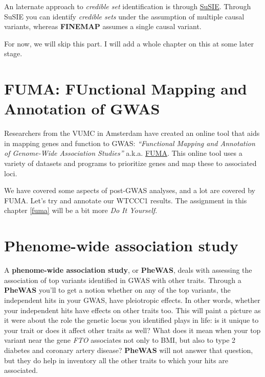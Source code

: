 \documentclass[
]{book}
\begin{document}
An laternate approach to \emph{credible set} identification is through \href{https://stephenslab.github.io/susieR/index.html}{SuSIE}. Through SuSIE you can identify \emph{credible sets} under the assumption of multiple causal variants, whereas \textbf{FINEMAP} assumes a single causal variant.

For now, we will skip this part. I will add a whole chapter on this at some later stage.

\hypertarget{fuma-functional-mapping-and-annotation-of-gwas}{%
\section{FUMA: FUnctional Mapping and Annotation of GWAS}\label{fuma-functional-mapping-and-annotation-of-gwas}}

Researchers from the VUMC in Amsterdam have created an online tool that aids in mapping genes and function to GWAS: \emph{``Functional Mapping and Annotation of Genome-Wide Association Studies''} a.k.a. \href{https://fuma.ctglab.nl}{FUMA}. This online tool uses a variety of datasets and programs to prioritize genes and map these to associated loci.

We have covered some aspects of post-GWAS analyses, and a lot are covered by FUMA. Let's try and annotate our WTCCC1 results. The assignment in this chapter \ref{fuma} will be a bit more \emph{Do It Yourself}.

\hypertarget{phenome-wide-association-study}{%
\section{Phenome-wide association study}\label{phenome-wide-association-study}}

A \textbf{phenome-wide association study}, or \textbf{PheWAS}, deals with assessing the association of top variants identified in GWAS with other traits. Through a \textbf{PheWAS} you'll to get a notion whether on any of the top variants, the independent hits in your GWAS, have pleiotropic effects. In other words, whether your independent hits have effects on other traits too. This will paint a picture as it were about the role the genetic locus you identified plays in life: is it unique to your trait or does it affect other traits as well? What does it mean when your top variant near the gene \emph{FTO} associates not only to BMI, but also to type 2 diabetes and coronary artery disease? \textbf{PheWAS} will not answer that question, but they do help in inventory all the other traits to which your hits are associated.
\end{document}
